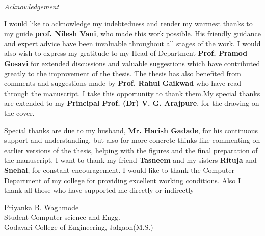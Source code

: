 \newpage
\thispagestyle{empty}

\begin{center}
\emph{\LARGE Acknowledgement}\\[2.5cm]
\end{center}

\normalsize I would like to acknowledge my indebtedness and render my warmest thanks
to my guide \textbf{prof. Nilesh Vani}, who made this work possible. His friendly guidance and expert advice have been invaluable throughout all stages of the work. I would also wish to express my gratitude to my Head of Department \textbf{Prof. Pramod Gosavi} for extended discussions and valuable suggestions which have contributed greatly to the improvement of the thesis. The thesis has also benefited from comments and suggestions made by \textbf{Prof. Rahul Gaikwad} who have read through the manuscript. I take this opportunity to thank them.My special thanks are extended to my \textbf{Principal Prof. (Dr) V. G. Arajpure}, for the drawing on the cover.

Special thanks are due to my husband, \textbf{Mr. Harish Gadade}, for his continuous support and understanding, but also for more concrete thinks like commenting on earlier versions of the thesis, helping with the figures and the final preparation of the manuscript. I want to thank my friend \textbf{Tasneem} and my sisters \textbf{Rituja} and \textbf{Snehal}, for constant encouragement. I would like to thank the Computer Department of my college for providing excellent working conditions. Also I thank all those who have supported me directly or indirectly\\[1.0cm]





\begin{flushright}
Priyanka B. Waghmode\\
Student Computer science and Engg.\\
Godavari College of Engineering, Jalgaon(M.S.) 
\end{flushright}

